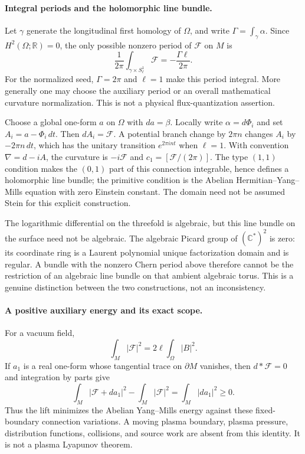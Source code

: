 \paragraph{Integral periods and the holomorphic line bundle.}
Let $\gamma$ generate the longitudinal first homology of $\Omega$, and write $\Gamma=\int_\gamma\alpha$. Since $H^2(\Omega;\mathbb R)=0$, the only possible nonzero period of $\mathcal F$ on $M$ is
\[
\frac{1}{2\pi}\int_{\gamma\times S^1_\ell}\mathcal F
=-\frac{\Gamma\ell}{2\pi}.
\]
For the normalized seed, $\Gamma=2\pi$ and $\ell=1$ make this period integral. More generally one may choose the auxiliary period or an overall mathematical curvature normalization. This is not a physical flux-quantization assertion.

Choose a global one-form $a$ on $\Omega$ with $da=\beta$. Locally write $\alpha=d\Phi_i$ and set $A_i=a-\Phi_i\,dt$. Then $dA_i=\mathcal F$. A potential branch change by $2\pi n$ changes $A_i$ by $-2\pi n\,dt$, which has the unitary transition $e^{2\pi int}$ when $\ell=1$. With convention $\nabla=d-iA$, the curvature is $-i\mathcal F$ and $c_1=[\mathcal F/(2\pi)]$. The type $(1,1)$ condition makes the $(0,1)$ part of this connection integrable, hence defines a holomorphic line bundle; the primitive condition is the Abelian Hermitian--Yang--Mills equation with zero Einstein constant. The domain need not be assumed Stein for this explicit construction.

The logarithmic differential on the threefold is algebraic, but this line bundle on the surface need not be algebraic. The algebraic Picard group of $(\mathbb C^*)^2$ is zero: its coordinate ring is a Laurent polynomial unique factorization domain and is regular. A bundle with the nonzero Chern period above therefore cannot be the restriction of an algebraic line bundle on that ambient algebraic torus. This is a genuine distinction between the two constructions, not an inconsistency.

\paragraph{A positive auxiliary energy and its exact scope.}
For a vacuum field,
\[
\int_M|\mathcal F|^2=2\ell\int_\Omega|B|^2.
\]
If $a_1$ is a real one-form whose tangential trace on $\partial M$ vanishes, then $d*\mathcal F=0$ and integration by parts give
\[
\int_M|\mathcal F+da_1|^2-\int_M|\mathcal F|^2
=\int_M|da_1|^2\ge0.
\]
Thus the lift minimizes the Abelian Yang--Mills energy against these fixed-boundary connection variations. A moving plasma boundary, plasma pressure, distribution functions, collisions, and source work are absent from this identity. It is not a plasma Lyapunov theorem.


